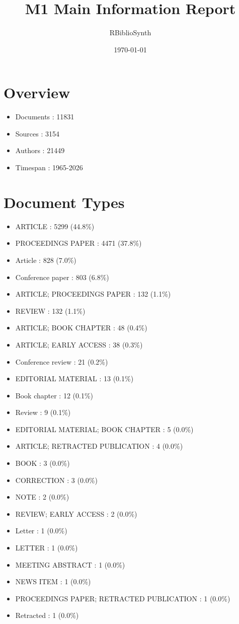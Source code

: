 \documentclass[12pt]{article}
\begin{document}
\title{M1 Main Information Report}
\author{RBiblioSynth}
\date{\today}
\maketitle
\section*{Overview}
\begin{itemize}
\item Documents : 11831
\item Sources : 3154
\item Authors : 21449
\item Timespan : 1965-2026
\end{itemize}
\section*{Document Types}
\begin{itemize}
\item ARTICLE : 5299 (44.8\%)
\item PROCEEDINGS PAPER : 4471 (37.8\%)
\item Article : 828 (7.0\%)
\item Conference paper : 803 (6.8\%)
\item ARTICLE; PROCEEDINGS PAPER : 132 (1.1\%)
\item REVIEW : 132 (1.1\%)
\item ARTICLE; BOOK CHAPTER : 48 (0.4\%)
\item ARTICLE; EARLY ACCESS : 38 (0.3\%)
\item Conference review : 21 (0.2\%)
\item EDITORIAL MATERIAL : 13 (0.1\%)
\item Book chapter : 12 (0.1\%)
\item Review : 9 (0.1\%)
\item EDITORIAL MATERIAL; BOOK CHAPTER : 5 (0.0\%)
\item ARTICLE; RETRACTED PUBLICATION : 4 (0.0\%)
\item BOOK : 3 (0.0\%)
\item CORRECTION : 3 (0.0\%)
\item NOTE : 2 (0.0\%)
\item REVIEW; EARLY ACCESS : 2 (0.0\%)
\item Letter : 1 (0.0\%)
\item LETTER : 1 (0.0\%)
\item MEETING ABSTRACT : 1 (0.0\%)
\item NEWS ITEM : 1 (0.0\%)
\item PROCEEDINGS PAPER; RETRACTED PUBLICATION : 1 (0.0\%)
\item Retracted : 1 (0.0\%)
\end{itemize}
\end{document}

